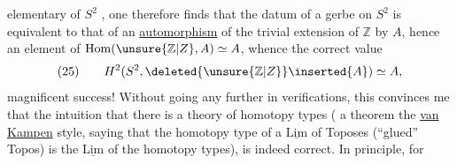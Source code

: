 elementary of $S^2$ , one therefore finds
that the datum of a gerbe on $S^2$ is equivalent
to that of an \uline{automorphism} of
the trivial extension  of $\mathbb Z$ by $A$,
hence  an element of $\operatorname{Hom}(\unsure{\mathbb Z|Z},A)\simeq A$,
whence the correct value
\[
(25)\qquad H^2(S^2,\deleted{\unsure{\mathbb Z|Z}}\inserted{A})\simeq A,
\]
magnificent success! Without going any
further in verifications, this
convinces me that the intuition that there
is a theory of 
 homotopy types ( a
theorem  the \uline{van Kampen} style, saying
that the homotopy type of a
$\underline{\mathrm{Lim}}$ of Toposes (``glued'' Topos) is
the $\underline{\mathrm{Lim}}$ of the homotopy types),
is indeed correct. In principle, for
